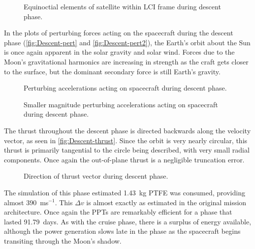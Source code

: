 \begin{figure}
\centering
\def\svgwidth{\figurewidth}

\caption{Equinoctial elements of satellite within LCI frame during descent phase.} \label{fig:Descent-mee}
\end{figure}

In the plots of perturbing forces acting on the spacecraft during the descent phase (\autoref{fig:Descent-pert} and \autoref{fig:Descent-pert2}), the Earth's orbit about the Sun is once again apparent in the solar gravity and solar wind. Forces due to the Moon's gravitational harmonics are increasing in strength as the craft gets closer to the surface, but the dominant secondary force is still Earth's gravity.

\begin{subfigures}
\begin{figure}
\centering
\def\svgwidth{\figurewidth}

\caption{Perturbing accelerations acting on spacecraft during descent phase.} \label{fig:Descent-pert}
\end{figure}

\begin{figure}
\centering
\def\svgwidth{\figurewidth}

\caption{Smaller magnitude perturbing accelerations acting on spacecraft during descent phase.} \label{fig:Descent-pert2}
\end{figure}
\end{subfigures}

The thrust throughout the descent phase is directed backwards along the velocity vector, as seen in \autoref{fig:Descent-thrust}. Since the orbit is very nearly circular, this thrust is primarily tangential to the circle being described, with very small radial components. Once again the out-of-plane thrust is a negligible truncation error.

\begin{figure}
\centering
\def\svgwidth{\figurewidth}

\caption{Direction of thrust vector during descent phase.} \label{fig:Descent-thrust}
\end{figure}

The simulation of this phase estimated 1.43~kg PTFE was consumed, providing almost 390~ms$^{-1}$. This $\Delta v$ is almost exactly as estimated in the original mission architecture. Once again the PPTs are remarkably efficient for a phase that lasted 91.79~days. As with the cruise phase, there is a surplus of energy available, although the power generation slows late in the phase as the spacecraft begins transiting through the Moon's shadow.

